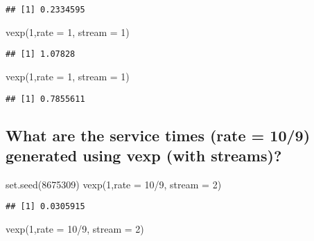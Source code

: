 \documentclass[
]{article}
\newenvironment{Shaded}{\begin{snugshade}}{\end{snugshade}}
\newcommand{\AttributeTok}[1]{\textcolor[rgb]{0.77,0.63,0.00}{#1}}
\newcommand{\DecValTok}[1]{\textcolor[rgb]{0.00,0.00,0.81}{#1}}
\newcommand{\FunctionTok}[1]{\textcolor[rgb]{0.00,0.00,0.00}{#1}}
\newcommand{\NormalTok}[1]{#1}
\newcommand{\SpecialCharTok}[1]{\textcolor[rgb]{0.00,0.00,0.00}{#1}}
\begin{document}
\begin{verbatim}
## [1] 0.2334595
\end{verbatim}

\begin{Shaded}
\begin{Highlighting}[]
\FunctionTok{vexp}\NormalTok{(}\DecValTok{1}\NormalTok{,}\AttributeTok{rate =} \DecValTok{1}\NormalTok{, }\AttributeTok{stream =} \DecValTok{1}\NormalTok{)}
\end{Highlighting}
\end{Shaded}

\begin{verbatim}
## [1] 1.07828
\end{verbatim}

\begin{Shaded}
\begin{Highlighting}[]
\FunctionTok{vexp}\NormalTok{(}\DecValTok{1}\NormalTok{,}\AttributeTok{rate =} \DecValTok{1}\NormalTok{, }\AttributeTok{stream =} \DecValTok{1}\NormalTok{)}
\end{Highlighting}
\end{Shaded}

\begin{verbatim}
## [1] 0.7855611
\end{verbatim}

\hypertarget{what-are-the-service-times-rate-109-generated-using-vexp-with-streams}{%
\subsection{What are the service times (rate = 10/9) generated using
vexp (with
streams)?}\label{what-are-the-service-times-rate-109-generated-using-vexp-with-streams}}

\begin{Shaded}
\begin{Highlighting}[]
\FunctionTok{set.seed}\NormalTok{(}\DecValTok{8675309}\NormalTok{)}
\FunctionTok{vexp}\NormalTok{(}\DecValTok{1}\NormalTok{,}\AttributeTok{rate =} \DecValTok{10}\SpecialCharTok{/}\DecValTok{9}\NormalTok{, }\AttributeTok{stream =} \DecValTok{2}\NormalTok{)}
\end{Highlighting}
\end{Shaded}

\begin{verbatim}
## [1] 0.0305915
\end{verbatim}

\begin{Shaded}
\begin{Highlighting}[]
\FunctionTok{vexp}\NormalTok{(}\DecValTok{1}\NormalTok{,}\AttributeTok{rate =} \DecValTok{10}\SpecialCharTok{/}\DecValTok{9}\NormalTok{, }\AttributeTok{stream =} \DecValTok{2}\NormalTok{)}
\end{Highlighting}
\end{Shaded}
\end{document}
